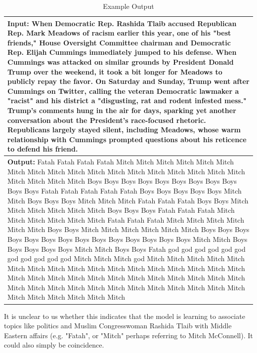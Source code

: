 \documentclass[11pt]{article}
\begin{document}
\begin{table}[h!]
\centering
\begin{tiny}
\begin{tabular}{|p{7cm}|} 
 \hline
 \textbf{Input:} When Democratic Rep. Rashida Tlaib accused Republican Rep. Mark Meadows of racism earlier this year, one of his "best friends," House Oversight Committee chairman and Democratic Rep. Elijah Cummings immediately jumped to his defense. When Cummings was attacked on similar grounds by President Donald Trump over the weekend, it took a bit longer for Meadows to publicly repay the favor. On Saturday and Sunday, Trump went after Cummings on Twitter, calling the veteran Democratic lawmaker a "racist" and his district a "disgusting, rat and rodent infested mess." Trump's comments hung in the air for days, sparking yet another conversation about the President's race-focused rhetoric. Republicans largely stayed silent, including Meadows, whose warm relationship with Cummings prompted questions about his reticence to defend his friend. \\ [0.5ex] 
 \hline
 \textbf{Output:} Fatah Fatah Fatah Fatah Mitch Mitch Mitch Mitch Mitch Mitch Mitch Mitch Mitch Mitch Mitch Mitch Mitch Mitch Mitch Mitch Mitch Mitch Mitch Mitch Mitch Mitch Boys Boys Boys Boys Boys Boys Boys Boys Boys Boys Boys Fatah Fatah Fatah Fatah Fatah Boys Boys Boys Boys Boys Mitch Mitch Boys Boys Boys Mitch Mitch Mitch Fatah Fatah Fatah Boys Boys Mitch Mitch Mitch Mitch Mitch Mitch Boys Boys Boys Fatah Fatah Fatah Mitch Mitch Mitch Mitch Mitch Mitch Fatah Fatah Fatah Mitch Mitch Mitch Mitch Mitch Mitch Boys Boys Mitch Mitch Mitch Mitch Mitch Mitch Boys Boys Boys Boys Boys Boys Boys Boys Boys Boys Boys Boys Boys Boys Mitch Mitch Boys Boys Boys Boys Boys Mitch Mitch Boys Boys Fatah god god god god god god god god god god god Mitch Mitch Mitch god Mitch Mitch Mitch Mitch Mitch Mitch Mitch Mitch Mitch Mitch Mitch Mitch Mitch Mitch Mitch Mitch Mitch Mitch Mitch Mitch Mitch Mitch Mitch Mitch Mitch Mitch Mitch Mitch Mitch Mitch Mitch Mitch Mitch Mitch Mitch Mitch Mitch Mitch Mitch Mitch Mitch Mitch Mitch Mitch Mitch Mitch Mitch  \\ 
 \hline
\end{tabular}
\end{tiny}
\caption{Example Output}
\label{table:example_bad}
\end{table}

It is unclear to us whether this indicates that the model is learning to associate topics like politics and Muslim Congresswoman Rashida Tlaib with Middle Eastern affairs (e.g. "Fatah", or "Mitch" perhaps referring to Mitch McConnell). It could also simply be coincidence.
\end{document}
